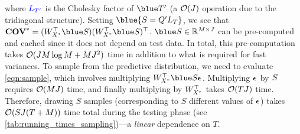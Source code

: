 where ${\color{blue} L_{T'} }$ is the Cholesky factor of $\blue \bT'$ (a $\bigo{J}$ operation due to the tridiagonal structure).
Setting $\blue{ \bS = \bQ' \bL_{\bT} }$, we see that $\Covtest = (\bW_{\bXtest}^\top {\blue \bS}) (\bW_{\bXtest}^\top {\blue \bS})^{\top}$.
${\blue S} \in \reals^{M \times J}$ can be pre-computed and cached since it does not depend on test data.
In total, this pre-computation takes $\bigo{J M \log M + M J^2}$ time in addition to what is required for fast variances.
To sample from the predictive distribution, we need to evaluate \cref{eqn:sample}, which involves multiplying $\bW^\top_{\bXtest} {\blue \bS} \bepsilon$.
Multiplying $\boldsymbol{\epsilon}$ by $S$ requires $\bigo{MJ}$ time, and finally multiplying by $W^{\top}_{X^*}$ takes $\bigo{TJ}$ time.
Therefore, drawing $S$ samples (corresponding to $S$ different values of $\boldsymbol{\epsilon}$) takes $\bigo{SJ(T + M)}$ time total during the testing phase (see \cref{tab:running_times_sampling})---a \emph{linear} dependence on $T$.



